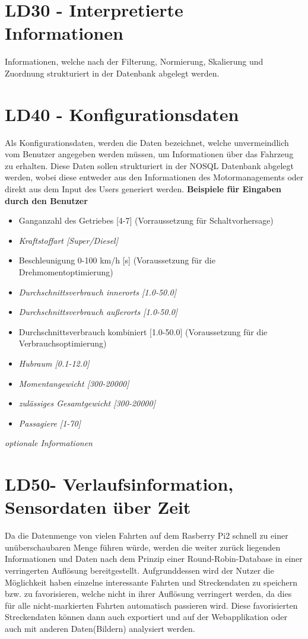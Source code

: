 \section{LD30 - Interpretierte Informationen}
Informationen, welche nach der Filterung, Normierung, Skalierung und Zuordnung strukturiert in der Datenbank abgelegt werden.

\newpage
\section{LD40 - Konfigurationsdaten}
Als Konfigurationsdaten, werden die Daten bezeichnet, welche unvermeindlich vom Benutzer angegeben werden müssen, um Informationen über das Fahrzeug zu erhalten.   Diese Daten sollen strukturiert in der NOSQL Datenbank abgelegt werden, wobei diese entweder aus den Informationen des Motormanagements oder direkt aus dem Input des Users generiert werden.
\nextline
\textbf{Beispiele für Eingaben durch den Benutzer}
\begin{itemize}
	\item Ganganzahl des Getriebes [4-7] (Vorraussetzung für Schaltvorhersage)
	\item \textit{Kraftstoffart [Super/Diesel]}
	\item Beschleunigung 0-100 km/h [s] (Voraussetzung für die Drehmomentoptimierung)
	\item \textit{Durchschnittsverbrauch innerorts [1.0-50.0]} 
	\item \textit{Durchschnittsverbrauch außerorts [1.0-50.0]}	
	\item Durchschnittsverbrauch kombiniert [1.0-50.0] (Voraussetzung für die Verbrauchsoptimierung)
	\item \textit{Hubraum [0.1-12.0]}
	\item \textit{Momentangewicht [300-20000]}
	\item \textit{zulässiges Gesamtgewicht [300-20000]}
	\item \textit{Passagiere [1-70]}
\end{itemize}
\textit{optionale Informationen}

\section{LD50- Verlaufsinformation, Sensordaten über Zeit}
Da die Datenmenge von vielen Fahrten auf dem Rasberry Pi2 schnell zu einer unüberschaubaren Menge führen würde, werden die weiter zurück liegenden Informationen und Daten nach dem Prinzip einer Round-Robin-Database in einer verringerten Auflösung bereitgestellt. 
Aufgrunddessen wird der Nutzer die Möglichkeit haben einzelne interessante Fahrten und Streckendaten zu speichern bzw. zu favorisieren, welche nicht in ihrer Auflösung verringert werden, da dies für alle nicht-markierten Fahrten automatisch passieren wird. Diese favorisierten Streckendaten können dann auch exportiert und auf der Webapplikation oder auch mit anderen Daten(Bildern) analysiert werden.
